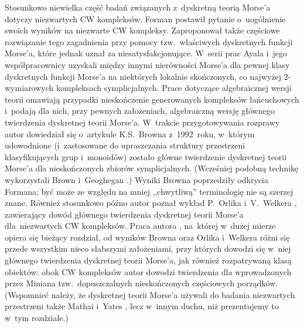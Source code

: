Stosunkowo niewielka część badań związanych z~dyskretną teorią Morse'a dotyczy niezwartych CW kompleksów. Forman \cite{Forman02} postawił pytanie o~uogólnienie swoich wyników na niezwarte CW kompleksy. Zaproponował także częściowe rozwiązanie tego zagadnienia przy pomocy tzw.~właściwych dyskretnych funkcji Morse'a, które jednak uznał za niesatysfakcjonujące. W~serii prac \cite{Ayala07,Ayala08,Ayala09a,Ayala09,Ayala10,Ayala11} Ayala i~jego współpracownicy uzyskali między innymi nierówności Morse'a dla pewnej klasy dyskretnych funkcji Morse'a na niektórych lokalnie skończonych, co najwyżej $2$-wymiarowych kompleksach symplicjalnych. Prace dotyczące algebraicznej wersji teorii \cite{Freij07,Jollenbeck05,Kozlov05,Skoldberg06} omawiają przypadki nieskończenie generowanych kompleksów łańcuchowych i~podają dla nich, przy pewnych założeniach, algebraiczną wersję głównego twierdzenia dyskretnej teorii Morse'a. W~trakcie przygotowywania rozprawy autor dowiedział się o~artykule K.S.~Browna \cite{Brown92} z~1992~roku, w~którym udowodnione (i~zastosowane do upraszczania struktury przestrzeni klasyfikujących grup i~monoidów) zostało główne twierdzenie dyskretnej teorii Morse'a dla nieskończonych zbiorów symplicjalnych. (Wcześniej podobną technikę wykorzystali Brown i~Geoghegan \cite{Brown84}.) Wyniki Browna poprzedziły odkrycia Formana; być może ze względu na mniej ,,chwytliwą'' terminologię nie są szerzej znane. Również stosunkowo późno autor poznał wykład P.~Orlika i~V.~Welkera \cite{Orlik07}, zawierający dowód głównego twierdzenia dyskretnej teorii Morse'a dla~niezwartych CW kompleksów. Praca autora \cite{Kukiela13}, na~której w~dużej mierze opiera się bieżący rozdział, od wyników Browna \cite{Brown92} oraz Orlika i~Welkera \cite{Orlik07} różni się przede wszystkim nieco słabszymi założeniami, przy których dowodzi się w~niej głównego twierdzenia dyskretnej teorii Morse'a, jak również rozpatrywaną klasą obiektów: obok CW kompleksów autor dowodzi twierdzenia dla wprowadzonych przez Miniana \cite{Minian12} tzw.~dopuszczalnych nieskończonych częściowych porządków. (Wspomnieć należy, że dyskretnej teorii Morse'a używali do badania niezwartych przestrzeni także Mathai i~Yates \cite{Mathai99}, lecz w~innym duchu, niż prezentujemy to w~tym rozdziale.) 

